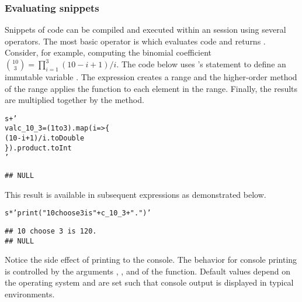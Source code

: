 \documentclass[article]{jss}\usepackage[]{graphicx}\usepackage[]{color}
\makeatletter
\newcommand{\hlstr}[1]{\textcolor[rgb]{0.192,0.494,0.8}{#1}}%
\newcommand{\hlopt}[1]{\textcolor[rgb]{0,0,0}{#1}}%
\newcommand{\hlstd}[1]{\textcolor[rgb]{0.345,0.345,0.345}{#1}}%
\newenvironment{kframe}{%
 \def\at@end@of@kframe{}%
 \ifinner\ifhmode%
  \def\at@end@of@kframe{\end{minipage}}%
  \begin{minipage}{\columnwidth}%
 \fi\fi%
 \def\FrameCommand##1{\hskip\@totalleftmargin \hskip-\fboxsep
 \colorbox{shadecolor}{##1}\hskip-\fboxsep
     \hskip-\linewidth \hskip-\@totalleftmargin \hskip\columnwidth}%
 \MakeFramed {\advance\hsize-\width
   \@totalleftmargin\z@ \linewidth\hsize
   \@setminipage}}%
 {\par\unskip\endMakeFramed%
 \at@end@of@kframe}
\newenvironment{knitrout}{}{} %
\newcommand{\R}{\proglang{R}\xspace}
\newcommand{\Scala}{\proglang{Scala}\xspace}
\makeatother
\begin{document}
\subsubsection[Evaluating Scala snippets]{Evaluating \Scala snippets}

Snippets of \Scala code can be compiled and executed within an \R session using
several operators.  The most basic operator is  which evaluates
\Scala code and returns .  Consider, for example, computing the
binomial coefficient ${10 \choose 3} = \prod_{i=1}^3 (10-i+1)/i$.  The code below
uses \Scala's  statement to define an immutable variable
.  The expression  creates a range and the higher-order  method of the
range applies the function  to each element  in the range.
Finally, the results are multiplied together by the  method.

\begin{knitrout}\small
{}\color{fgcolor}\begin{kframe}
\begin{alltt}
\hlstd{s} \hlopt{+} \hlstr{'
  val c_10_3 = (1 to 3).map( i => \{
    (10-i+1) / i.toDouble
  \}).product.toInt
'}
\end{alltt}
\begin{verbatim}
## NULL
\end{verbatim}
\end{kframe}
\end{knitrout}

This result is available in subsequent \Scala expressions as demonstrated
below.

\begin{knitrout}\small
{}\color{fgcolor}\begin{kframe}
\begin{alltt}
\hlstd{s} \hlopt{*} \hlstr{'print("10 choose 3 is " + c_10_3 + ".")'}
\end{alltt}
\begin{verbatim}
## 10 choose 3 is 120.
## NULL
\end{verbatim}
\end{kframe}
\end{knitrout}

Notice the side effect of printing  to the console.  The behavior for
console printing is controlled by the arguments ,
, and  of the  function.  Default values
depend on the operating system and are set such that console output is
displayed in typical environments.
\end{document}
